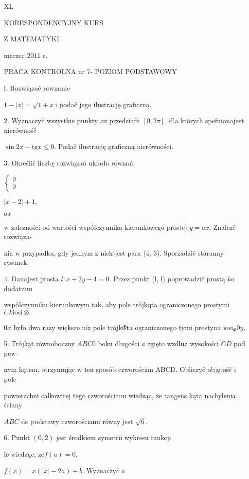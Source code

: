 \documentclass[a4paper,12pt]{article}
\begin{document}
XL

KORESPONDENCYJNY KURS

Z MATEMATYKI

marzec 2011 r.

PRACA KONTROLNA nr 7- POZIOM PODSTAWOWY

l. Rozwiązač równanie

$1-|x|=\sqrt{1+x} \mathrm{i}$ podač jego ilustrację graficzną.

2. Wyznaczyč wszystkie punkty $x\mathrm{z}$ przedziafu $[0,2\pi]$, dla których spefnionajest nierównośč

$\sin 2x-\mathrm{t}\mathrm{g}x\leq 0$. Podač ilustrację graficzną nierówności.

3. Określič liczbę rozwiązań ukfadu równań

$\left\{\begin{array}{l}
y\\
y
\end{array}\right.$

$|x-2|+1,$

$ax$

$\mathrm{w}$ zalezności od wartości współczynnika kierunkowego prostej $y=ax$. Znalez$\acute{}$č rozwiąza-

nia $\mathrm{w}$ przypadku, gdy jednym $\mathrm{z}$ nich jest para (4, 3). Sporzadzič staranny rysunek.

4. Danajest prosta $l:x+2y-4=0$. Przez punkt (l, l) poprowadzič prostą $k\mathrm{o}$ dodatnim

współczynniku kierunkowym $\mathrm{t}\mathrm{a}\mathrm{k}$, aby pole trójkqta ograniczonego prostymi $l,  k\mathrm{i}\mathrm{o}\mathrm{s}\mathrm{i}\otimes$

$0x$ byfo dwa razy większe $\mathrm{n}\mathrm{i}\dot{\mathrm{z}}$ pole trójk$\Phi$ta ograniczonego tymi prostymi $\mathrm{i}\mathrm{o}\mathrm{s}\mathrm{i}_{\Phi}0y.$

5. Trójkąt równoboczny $ABC0$ boku długości $a$ zgięto wzdluz wysokości $CD$ pod pew-

nym kątem, otrzymujqc $\mathrm{w}$ ten sposób czworościan ABCD. Obliczyč objętośč $\mathrm{i}$ pole

powierzchni calkowitej tego czworościanu wiedząc, $\dot{\mathrm{z}}\mathrm{e}$ tangens kąta nachylenia ściany

$ABC$ do podstawy czworościanu równy jest $\sqrt{6}.$

6. Punkt $(0,2)$ jest środkiem symetrii wykresu funkcji

$\mathrm{i}b$ wiedząc, $\dot{\mathrm{z}}\mathrm{e} f(a)=0.$

$f(x)=x(|x|-2a)+b$. Wyznaczyč $a$
\end{document}
